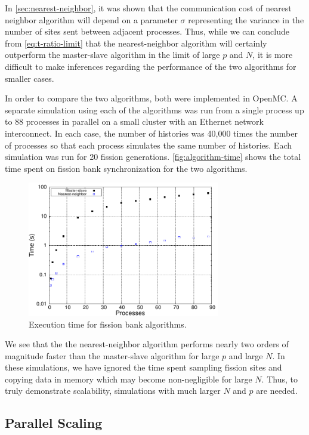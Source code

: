 In \autoref{sec:nearest-neighbor}, it was shown that the communication cost of
nearest neighbor algorithm will depend on a parameter $\sigma$ representing the
variance in the number of sites sent between adjacent processes. Thus, while we
can conclude from \eqref{eq:t-ratio-limit} that the nearest-neighbor algorithm
will certainly outperform the master-slave algorithm in the limit of large $p$
and $N$, it is more difficult to make inferences regarding the performance of
the two algorithms for smaller cases.

In order to compare the two algorithms, both were implemented in OpenMC. A
separate simulation using each of the algorithms was run from a single process
up to 88 processes in parallel on a small cluster with an Ethernet network
interconnect. In each case, the number of histories was 40,000 times the number
of processes so that each process simulates the same number of histories. Each
simulation was run for 20 fission generations. \autoref{fig:algorithm-time}
shows the total time spent on fission bank synchronization for the two
algorithms.
\begin{figure}[ht!]
  \centering
  \includegraphics[width=0.75\textwidth]{figures/ch3/algorithm_results/time.pdf}
  \caption{Execution time for fission bank algorithms.}
  \label{fig:algorithm-time}
\end{figure}
We see that the the nearest-neighbor algorithm performs nearly two orders of
magnitude faster than the master-slave algorithm for large $p$ and large $N$. In
these simulations, we have ignored the time spent sampling fission sites and
copying data in memory which may become non-negligible for large $N$. Thus, to
truly demonstrate scalability, simulations with much larger $N$ and $p$ are
needed.

\subsection{Parallel Scaling}

